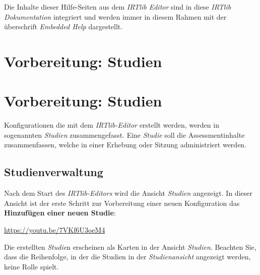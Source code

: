 \documentclass[
  letterpaper,
  DIV=11]{scrreprt}
\begin{document}
\begin{tcolorbox}[enhanced jigsaw, colbacktitle=quarto-callout-tip-color!10!white, coltitle=black, colframe=quarto-callout-tip-color-frame, leftrule=.75mm, breakable, opacitybacktitle=0.6, toprule=.15mm, title=\textcolor{quarto-callout-tip-color}{\faLightbulb}\hspace{0.5em}{Embedded Help}, colback=white, titlerule=0mm, arc=.35mm, bottomtitle=1mm, toptitle=1mm, rightrule=.15mm, bottomrule=.15mm, left=2mm, opacityback=0]

Die Inhalte dieser Hilfe-Seiten aus dem \emph{IRTlib Editor} sind in
diese \emph{IRTlib Dokumentation} integriert und werden immer in diesem
Rahmen mit der überschrift \emph{Embedded Help} dargestellt.

\end{tcolorbox}


\hypertarget{vorbereitung-studien}{%
\chapter{Vorbereitung: Studien}\label{vorbereitung-studien}}


\hypertarget{vorbereitung-studien-1}{%
\chapter{Vorbereitung: Studien}\label{vorbereitung-studien-1}}

Konfigurationen die mit dem \emph{IRTlib-Editor} erstellt werden, werden
in sogenannten \emph{Studien} zusammengefasst. Eine \emph{Studie} soll
die Assessmentinhalte zusammenfassen, welche in einer Erhebung oder
Sitzung administriert werden.

\hypertarget{studienverwaltung-1}{%
\section{Studienverwaltung}\label{studienverwaltung-1}}

Nach dem Start des \emph{IRTlib-Editors} wird die Ansicht \emph{Studien}
angezeigt. In dieser Ansicht ist der erste Schritt zur Vorbereitung
einer neuen Konfiguration das \textbf{Hinzufügen einer neuen Studie}:

\url{https://youtu.be/7VKf6U3oeM4}

Die erstellten \emph{Studie}n erscheinen als Karten in der Ansicht
\emph{Studien}. Beachten Sie, dass die Reihenfolge, in der die Studien
in der \emph{Studienansicht} angezeigt werden, keine Rolle spielt.
\end{document}
